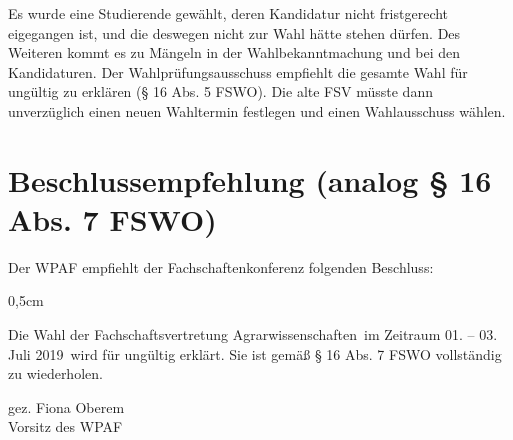 \documentclass[a4paper]{scrartcl}
\newcommand{\fachschaft}{Agrarwissenschaften}
\newcommand{\wahltermin}{01. -- 03. Juli 2019}
\newcommand{\vorsitz}{Fiona Oberem}
\begin{document}



Es wurde eine Studierende gewählt, deren Kandidatur nicht fristgerecht eigegangen ist, und die  deswegen nicht zur Wahl hätte stehen dürfen. Des Weiteren kommt es zu Mängeln in der Wahlbekanntmachung und bei den Kandidaturen. Der Wahlprüfungsausschuss empfiehlt die gesamte Wahl für ungültig zu erklären (§ 16 Abs. 5 FSWO). Die alte FSV müsste dann unverzüglich einen neuen Wahltermin festlegen und einen Wahlausschuss wählen.


\section*{Beschlussempfehlung (analog § 16 Abs. 7 FSWO)}

Der WPAF empfiehlt der Fachschaftenkonferenz folgenden Beschluss:

\begin{addmargin}{0,5cm}
\itshape

 Die Wahl der Fachschaftsvertretung \fachschaft\ im Zeitraum \wahltermin\ wird für ungültig erklärt. Sie ist gemäß § 16 Abs. 7 FSWO vollständig zu wiederholen.
\end{addmargin}
\vspace{1em}
gez. \vorsitz\\
Vorsitz des WPAF
\end{document}
